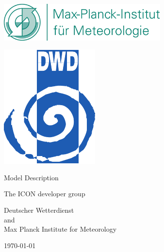 \documentclass[DIV16,BCOR1cm,11pt,a4paper,twoside]{scrreprt}
\begin{document}
\pagestyle{empty}

\renewcommand{\footnoterule}{\rule{0pt}{0pt}\vspace{0pt}}

\begin{center}
\ifpdf
\parbox{2cm}{
\includegraphics[height=2cm]{../resources/img/mpilogo.pdf}
}
\hfill
\parbox{2cm}{
\includegraphics{../resources/img/dwdlogo.pdf}
}
\fi
\end{center}

\vspace{2cm}

\begin{center}
{\sectfont\Huge
\color{mpggreen}Model Description\color{black}\\[0.5ex]
}
\end{center}

\vspace{2cm}

\begin{center}
{\sectfont\Large
The ICON developer group}
\end{center}

\vspace{1cm}

\begin{center}
{\sectfont\Large
Deutscher Wetterdienst\\and\\
Max Planck Institute for Meteorology\\

\vspace{1cm}

\today}
\end{center}
\cleardoublepage

\tableofcontents

\cleardoublepage
\pagestyle{plain}








\end{document}
